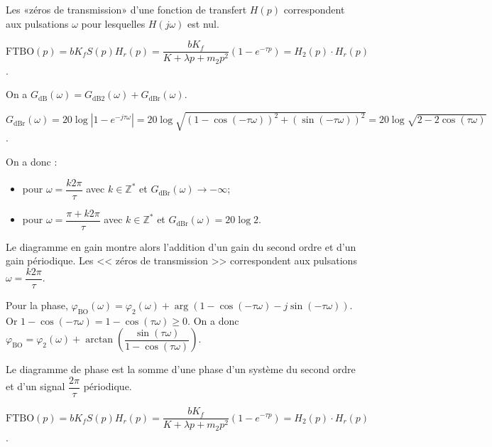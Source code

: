 Les «zéros de transmission» d'une fonction de transfert $H(p)$ correspondent aux pulsations $\omega$ pour lesquelles $H(j \omega)$ est nul.\\
\ifprof
\begin{corrige}



$\text{FTBO}(p)=bK_f S(p)H_r(p)= \dfrac{bK_f}{K+\lambda p +m_2 p^2}\left(1-e^{-\tau p}\right) = H_2(p)\cdot H_r(p)$.

On a $G_{\text{dB}}(\omega)=G_{\text{dB2}}(\omega) + G_{\text{dBr}}(\omega)$.

$G_{\text{dBr}}(\omega) = 20\log \left|1-e^{-j\tau \omega} \right|=20\log 
\sqrt{\left( 1-\cos \left(-\tau \omega \right)\right)^2 + \left( \sin \left(-\tau \omega \right)\right)^2 } = 20\log \sqrt{2-2\cos \left( \tau \omega \right)}$.

On a donc :
\begin{itemize}
\item pour $\omega=\dfrac{k2\pi }{\tau}$ avec $k\in \mathbb{Z}^*$ et $G_{\text{dBr}}(\omega) \to -\infty $;
\item pour $\omega=\dfrac{\pi + k2\pi }{\tau}$ avec $k\in \mathbb{Z}^*$ et $G_{\text{dBr}}(\omega) = 20 \log 2$.
\end{itemize}

Le diagramme en gain montre alors l'addition d'un gain du second ordre et d'un gain périodique. Les << zéros de transmission >> correspondent aux pulsations $\omega=\dfrac{k2\pi }{\tau}$.

Pour la phase, $\varphi_{\text{BO}}\left( \omega\right)=\varphi_2\left( \omega\right)+\arg\left( 1-\cos\left( -\tau\omega\right) - j\sin\left(-\tau\omega\right)\right)$. Or $1-\cos\left( -\tau\omega\right) = 1-\cos\left( \tau \omega \right) \geq 0$. On a donc 
 $\varphi_{\text{BO}}=\varphi_2\left( \omega\right)+\arctan \left(\dfrac{\sin\left( \tau\omega\right)}{1-\cos\left( \tau\omega\right)} \right)$.

Le diagramme de  phase est la somme d'une phase d'un système du second ordre et d'un signal $\dfrac{2\pi}{\tau}$ périodique. 




$\text{FTBO}(p)=bK_f S(p)H_r(p)= \dfrac{bK_f}{K+\lambda p +m_2 p^2}\left(1-e^{-\tau p}\right) = H_2(p)\cdot H_r(p)$.


\end{corrige}

